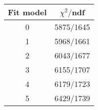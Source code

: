 \begin{tabular}{c|c}
Fit model & $\chi^2/$ndf \\
\hline
0 & 5875/1645\\
1 & 5968/1661\\
2 & 6043/1677\\
3 & 6155/1707\\
4 & 6179/1723\\
5 & 6429/1739\\
\end{tabular}
